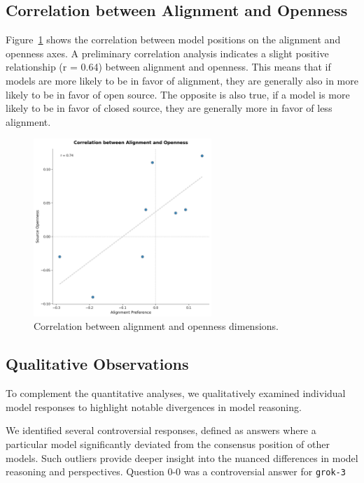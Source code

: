 \subsection{Correlation between Alignment and Openness}

Figure~\ref{fig:correlation} shows the correlation between model positions on the alignment and openness axes. A preliminary correlation analysis indicates a slight positive relationship (r = 0.64) between alignment and openness. This means that if models are more likely to be in favor of alignment, they are generally also in more likely to be in favor of open source. The opposite is also true, if a model is more likely to be in favor of closed source, they are generally more in favor of less alignment.

\begin{figure}[htbp]
    \centering
    \includegraphics[width=0.6\textwidth]{figures/alignment_openness_correlation.png}
    \caption{Correlation between alignment and openness dimensions.}
    \label{fig:correlation}
\end{figure}

\subsection{Qualitative Observations}

To complement the quantitative analyses, we qualitatively examined individual model responses to highlight notable divergences in model reasoning.

We identified several controversial responses, defined as answers where a particular model significantly deviated from the consensus position of other models. Such outliers provide deeper insight into the nuanced differences in model reasoning and perspectives. Question 0-0 was a controversial answer for \texttt{grok-3}


